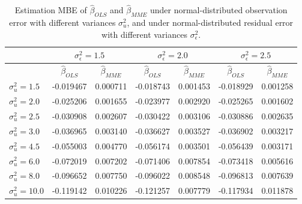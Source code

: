 \documentclass{article}
\begin{document}
\begin{table}[ht]
    \centering
    \caption{Estimation MBE of $\hat{\beta}_{OLS}$ and $\hat{\beta}_{MME}$ under normal-distributed observation error with different variances $\sigma^2_u$, and under normal-distributed residual error with different variances $\sigma^2_\epsilon$.}
    \label{Tab:MBE_normal}
    \begin{tabular}[t]{lcccccc}
        \hline
        &\multicolumn{2}{c}{$\sigma^2_\epsilon=1.5$}&\multicolumn{2}{c}{$\sigma^2_\epsilon=2.0$}&\multicolumn{2}{c}{$\sigma^2_\epsilon=2.5$}\\
        \hline
        &$\hat{\beta}_{OLS}$&$\hat{\beta}_{MME}$&$\hat{\beta}_{OLS}$&$\hat{\beta}_{MME}$&$\hat{\beta}_{OLS}$&$\hat{\beta}_{MME}$\\
        \hline
        $\sigma^2_u = 1.5$&-0.019467&0.000711&-0.018743&0.001453&-0.018929&0.001258\\
        $\sigma^2_u = 2.0$&-0.025206&0.001655&-0.023977&0.002920&-0.025265&0.001602\\
        $\sigma^2_u = 2.5$&-0.030908&0.002607&-0.030422&0.003106&-0.030886&0.002635\\
        $\sigma^2_u = 3.0$&-0.036965&0.003140&-0.036627&0.003527&-0.036902&0.003217\\
        $\sigma^2_u = 4.5$&-0.055003&0.004770&-0.056174&0.003501&-0.056439&0.003171\\
        $\sigma^2_u = 6.0$&-0.072019&0.007202&-0.071406&0.007854&-0.073418&0.005616\\
        $\sigma^2_u = 8.0$&-0.096652&0.007750&-0.096022&0.008548&-0.096813&0.007639\\
        $\sigma^2_u = 10.0$&-0.119142&0.010226&-0.121257&0.007779&-0.117934&0.011878\\
    \end{tabular}
\end{table}
\end{document}
